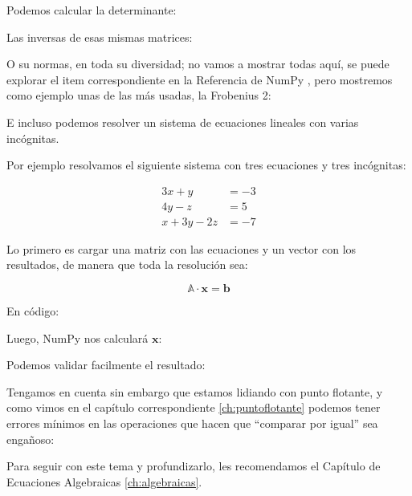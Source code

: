 Podemos calcular la determinante:


Las inversas de esas mismas matrices:


O su normas, en toda su diversidad; no vamos a mostrar todas aquí, se puede explorar el item correspondiente en la Referencia de NumPy \cite{numpy-normas}, pero mostremos como ejemplo unas de las más usadas, la Frobenius 2:


E incluso podemos resolver un sistema de ecuaciones lineales con varias incógnitas.

Por ejemplo resolvamos el siguiente sistema con tres ecuaciones y tres incógnitas:

\begin{align*}
    3x+y &= -3 \\
    4y-z &= 5 \\
    x+3y-2z &= -7
\end{align*}

Lo primero es cargar una matriz con las ecuaciones y un vector con los resultados, de manera que toda la resolución sea:

\begin{equation*}
    \mathbb{A} \cdot \bm{x} = \bm{b}
\end{equation*}

En código:


Luego, NumPy nos calculará $\bm{x}$:


Podemos validar facilmente el resultado:


Tengamos en cuenta sin embargo que estamos lidiando con punto flotante, y como vimos en el capítulo correspondiente \ref{ch:puntoflotante} podemos tener errores mínimos en las operaciones que hacen que ``comparar por igual'' sea engañoso:


Para seguir con este tema y profundizarlo, les recomendamos el Capítulo de Ecuaciones Algebraicas \ref{ch:algebraicas}.
